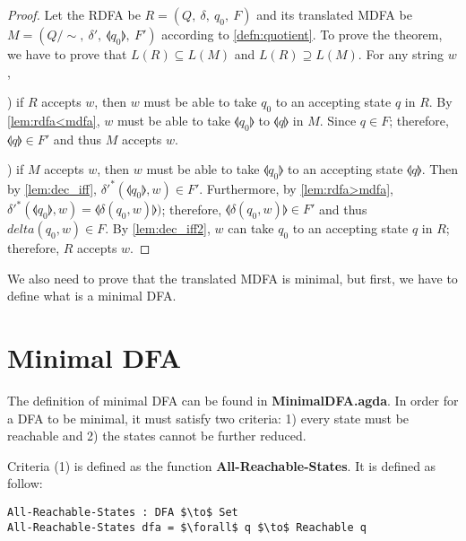 \begin{proof}
\noindent Let the RDFA be \(R = (Q,\ \delta,\ q_0,\ F)\) and its
translated MDFA be \(M = (Q/\!\sim,\ \delta',\ \llangle q_0 \rrangle,\
F')\) according to \autoref{defn:quotient}. To prove the theorem, we
have to prove that \(L(R) \subseteq L(M)\) and \(L(R) \supseteq
L(M)\). For any string \(w\),

\par {}) if \(R\) accepts \(w\), then \(w\) must be able to
take \(q_0\) to an accepting state \(q\) in \(R\). By \autoref{lem:rdfa<mdfa},
\(w\) must be able to take \(\llangle q_0 \rrangle\) to \(\llangle q
\rrangle\) in \(M\). Since \(q \in F\); therefore, \(\llangle q
\rrangle \in F'\) and thus \(M\) accepts \(w\). 

\par {}) if \(M\) accepts \(w\), then \(w\) must be able to
take \(\llangle q_0 \rrangle\) to an accepting state \(\llangle q
\rrangle\). Then by \autoref{lem:dec_iff}, \(\delta'^*(\llangle q_0
\rrangle,w) \in F'\). Furthermore, by \autoref{lem:rdfa>mdfa},
\(\delta'^*(\llangle q_0 \rrangle,w) = \llangle \delta(q_0,w)
\rrangle)\); therefore, \(\llangle \delta(q_0,w) \rrangle \in F'\) and
thus \(delta(q_0,w) \in F\). By \autoref{lem:dec_iff2}, \(w\) can take
\(q_0\) to an accepting state \(q\) in \(R\); therefore, \(R\) accepts
\(w\). 
\end{proof}

\par We also need to prove that the translated MDFA is minimal, but
first, we have to define what is a minimal DFA. 


\section{Minimal DFA}
\par The definition of minimal DFA can be found in
\textbf{MinimalDFA.agda}. In order for a DFA to be minimal,
it must satisfy two criteria: 1) every state must be reachable and 2) the
states cannot be further reduced. 

\par Criteria (1) is defined as the function
\textbf{All-Reachable-States}. It is defined as follow: 
\begin{lstlisting}[mathescape=true,xleftmargin=.1\textwidth]
All-Reachable-States : DFA $\to$ Set
All-Reachable-States dfa = $\forall$ q $\to$ Reachable q
\end{lstlisting}

